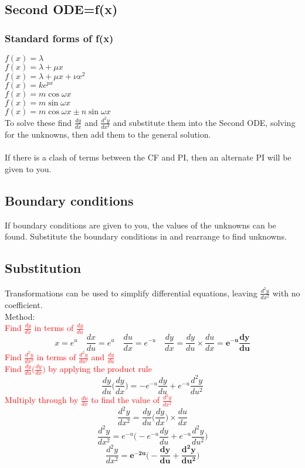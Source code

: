 \documentclass{article}[18pt]
\begin{document}
\subsection{Second ODE=f(x)}
\subsubsection{Standard forms of f(x)}
$f(x)=\lambda$\\
$f(x)=\lambda+\mu x$\\
$f(x)=\lambda+\mu x+\nu x^2$\\
$f(x)=ke^{px}$\\
$f(x)=m\cos\omega x$\\
$f(x)=m\sin\omega x$\\
$f(x)=m\cos\omega x\pm n\sin\omega x$
\\
To solve these find $\frac{dy}{dx}$ and $\frac{d^2y}{dx^2}$ and substitute them into the Second ODE, solving for the unknowns, then add them to the general solution.\\
\\
If there is a clash of terms between the CF and PI, then an alternate PI will be given to you.
\subsection{Boundary conditions}
If boundary conditions are given to you, the values of the unknowns can be found. Substitute the boundary conditions in and rearrange to find unknowns.
\newpage
\subsection{Substitution}
Transformations can be used to simplify differential equations, leaving $\frac{d^2y}{dx^2}$ with no coefficient.\\
Method:\\
\textcolor{red}{\large Find $\frac{dy}{dx}$ in terms of $\frac{dy}{du}$}
$$x=e^u \quad \frac{dx}{du}=e^u \quad \frac{du}{dx}=e^{-u} \quad 
\frac{dy}{dx}=\frac{dy}{du}\times\frac{du}{dx}=\mathbf{e^{-u}\frac{dy}{du}}
$$
\textcolor{red}{\large Find $\frac{d^2y}{dx^2}$ in terms of $\frac{d^2y}{du^2}$ and $\frac{dy}{du}$}\\
\textcolor{red}{Find $\frac{dy}{du}\Big(\frac{dy}{dx}\Big)$ by applying the product rule}
$$\frac{dy}{du}\Big(\frac{dy}{dx}\Big)=-e^{-u}\frac{dy}{du}+e^{-u}\frac{d^2y}{du^2}$$
\textcolor{red}{Multiply through by $\frac{du}{dx}$ to find the value of $\frac{d^2y}{dx^2}$}
$$\frac{d^2y}{dx^2}=\frac{dy}{du}\Big(\frac{dy}{dx}\Big)\times\frac{du}{dx}$$
$$\frac{d^2y}{dx^2}=e^{-u}\Big(-e^{-u}\frac{dy}{du}+e^{-u}\frac{d^2y}{du^2}\Big)$$
$$\frac{d^2y}{dx^2}=\mathbf{e^{-2u}\Big(-\frac{dy}{du}+\frac{d^2y}{du^2}\Big)}$$
\end{document}
